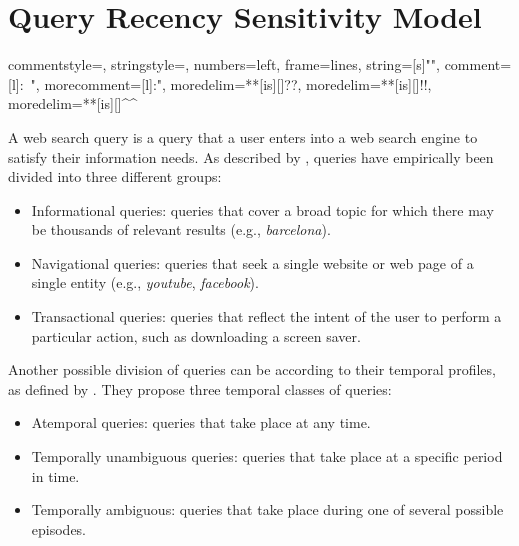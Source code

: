 \chapter{Query Recency Sensitivity Model}
\label{ch:query}


{
  commentstyle=\color{eclipseStrings}, %
  stringstyle=\color{eclipseKeywords}, %
  numbers=left,
  frame=lines,
  string=[s]{"}{"},
  comment=[l]{:\ "},
  morecomment=[l]{:"},
  moredelim=**[is][\color{blue}]{?}{?},
  moredelim=**[is][\color{orange}]{!}{!},
  moredelim=**[is][\color{red}]{^}{^}
}

A web search query is a query that a user enters into a web search engine to satisfy their information needs. As described by \citet{broder2002taxonomy}, queries have empirically been divided into three different groups:
\begin{itemize}
	\item Informational queries: queries that cover a broad topic for which there may be thousands of relevant results (e.g., \textit{barcelona}).
	\item Navigational queries: queries that seek a single website or web page of a single entity (e.g., \textit{youtube}, \textit{facebook}).
	\item Transactional queries: queries that reflect the intent of the user to perform a particular action, such as downloading a screen saver.
\end{itemize}

Another possible division of queries can be according to their temporal profiles, as defined by \citet{jones2007temporal}. They propose three temporal classes of queries:
\begin{itemize}
	\item Atemporal queries: queries that take place at any time.
    \item Temporally unambiguous queries: queries that take place at a specific period in time.
    \item Temporally ambiguous: queries that take place during one of several possible episodes.
\end{itemize}

